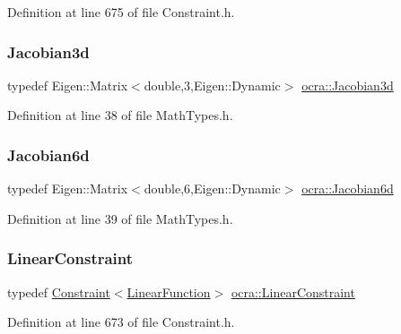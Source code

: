 Definition at line 675 of file Constraint.\+h.

\hypertarget{namespaceocra_a9d83c179b8710177bed2bbba41a12447}{}\label{namespaceocra_a9d83c179b8710177bed2bbba41a12447} 
\subsubsection{\texorpdfstring{Jacobian3d}{Jacobian3d}}
{\footnotesize\ttfamily typedef Eigen\+::\+Matrix$<$double,3,Eigen\+::\+Dynamic$>$ \hyperlink{namespaceocra_a9d83c179b8710177bed2bbba41a12447}{ocra\+::\+Jacobian3d}}



Definition at line 38 of file Math\+Types.\+h.

\hypertarget{namespaceocra_ac73b015f9f7cb0c252c4d5c4800f559a}{}\label{namespaceocra_ac73b015f9f7cb0c252c4d5c4800f559a} 
\subsubsection{\texorpdfstring{Jacobian6d}{Jacobian6d}}
{\footnotesize\ttfamily typedef Eigen\+::\+Matrix$<$double,6,Eigen\+::\+Dynamic$>$ \hyperlink{namespaceocra_ac73b015f9f7cb0c252c4d5c4800f559a}{ocra\+::\+Jacobian6d}}



Definition at line 39 of file Math\+Types.\+h.

\hypertarget{namespaceocra_ae8b87cf4099be3efc3b410019ad2046e}{}\label{namespaceocra_ae8b87cf4099be3efc3b410019ad2046e} 
\subsubsection{\texorpdfstring{Linear\+Constraint}{LinearConstraint}}
{\footnotesize\ttfamily typedef \hyperlink{classocra_1_1Constraint}{Constraint}$<$\hyperlink{classocra_1_1LinearFunction}{Linear\+Function}$>$ \hyperlink{namespaceocra_ae8b87cf4099be3efc3b410019ad2046e}{ocra\+::\+Linear\+Constraint}}



Definition at line 673 of file Constraint.\+h.

\hypertarget{namespaceocra_a1dc9b2b863ed7542eb48b66c2fe5793a}{}\label{namespaceocra_a1dc9b2b863ed7542eb48b66c2fe5793a} 
